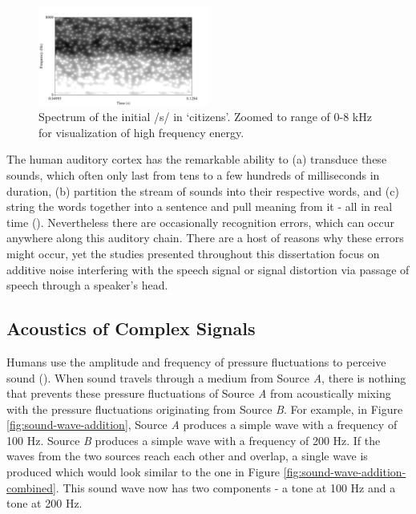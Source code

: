 \begin{figure}
\centering
  \includegraphics[width=0.5\textwidth]{figure/spctgrm_s.png}
  \caption{Spectrum of the initial /s/ in `citizens'. Zoomed to range of 0-8 kHz for visualization of high frequency energy.}
  \label{fig:spctgrm_s}
\end{figure}
%
The human auditory cortex has the remarkable ability to (a) transduce these sounds, which often only last from tens to a few hundreds of milliseconds in duration, (b) partition the stream of sounds into their respective words, and (c) string the words together into a sentence and pull meaning from it - all in real time (\cite{celesia:15}).  Nevertheless there are occasionally recognition errors, which can occur anywhere along this auditory chain.  %
There are a host of reasons why these errors might occur, yet the studies presented throughout this dissertation focus on additive noise interfering with the speech signal or signal distortion via passage of speech through a speaker's head.

\subsection{Acoustics of Complex Signals}

Humans use the amplitude and frequency of pressure fluctuations to perceive sound (\cite{rosen:91}). When sound travels through a medium from Source \textit{A}, there is nothing that prevents these pressure fluctuations of Source \textit{A} from acoustically mixing with the pressure fluctuations originating from Source \textit{B}.  For example, in Figure \ref{fig:sound-wave-addition}, Source \textit{A} produces a simple wave with a frequency of 100 Hz.  Source \textit{B} produces a simple wave with a frequency of 200 Hz.  If the waves from the two sources reach each other and overlap, a single wave is produced which would look similar to the one in Figure \ref{fig:sound-wave-addition-combined}.  This sound wave now has two components - a tone at 100 Hz and a tone at 200 Hz.

